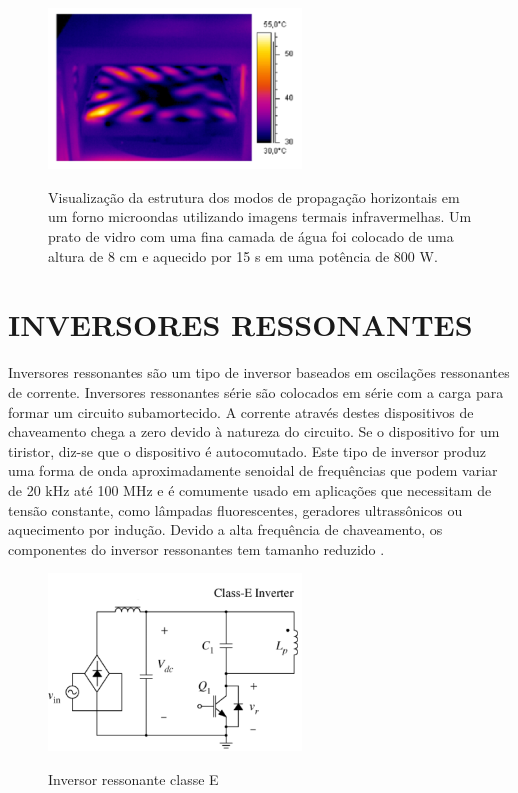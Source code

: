 \begin{figure}[!htb]
    \centering
    \caption{Visualização da estrutura dos modos de propagação horizontais em um forno microondas utilizando imagens termais infravermelhas. Um prato de vidro com uma fina camada de água foi colocado de uma altura de 8 cm e aquecido por 15 s em uma potência de 800 W.}
    \includegraphics[width=0.6\textwidth]{./dados/figuras/micronodes}
    \label{fig:figura-fontferro}
\end{figure}


\section{INVERSORES RESSONANTES}
\label{sec:inverter}

Inversores ressonantes são um tipo de inversor baseados em oscilações ressonantes de corrente.  Inversores ressonantes série são colocados em série com a carga para formar um circuito subamortecido. A corrente através destes dispositivos de chaveamento chega a zero devido à natureza do circuito. Se o dispositivo for um tiristor, diz-se que o dispositivo é autocomutado. 
Este tipo de inversor produz uma forma de onda aproximadamente senoidal de frequências que podem variar de 20 kHz até 100 MHz e é comumente usado em aplicações que necessitam de tensão constante, como lâmpadas fluorescentes, geradores ultrassônicos ou aquecimento por indução. Devido a alta frequência de chaveamento, os componentes do inversor ressonantes tem tamanho reduzido \cite{Rashid}.

\begin{figure}[!htb]
    \centering
    \caption{Inversor ressonante classe E}
    \includegraphics[width=0.6\textwidth]{./dados/figuras/inverter}
    \label{fig:figura-fontferro}
\end{figure}


